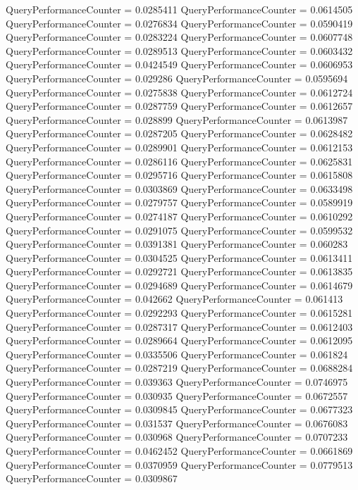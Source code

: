 \documentclass[9pt]{article}
\theoremstyle{plain}
\theoremstyle{definition}
\theoremstyle{remark}
\numberwithin{equation}{section}
\begin{document}
QueryPerformanceCounter  =  0.0285411
QueryPerformanceCounter  =  0.0614505
QueryPerformanceCounter  =  0.0276834
QueryPerformanceCounter  =  0.0590419
QueryPerformanceCounter  =  0.0283224
QueryPerformanceCounter  =  0.0607748
QueryPerformanceCounter  =  0.0289513
QueryPerformanceCounter  =  0.0603432
QueryPerformanceCounter  =  0.0424549
QueryPerformanceCounter  =  0.0606953
QueryPerformanceCounter  =  0.029286
QueryPerformanceCounter  =  0.0595694
QueryPerformanceCounter  =  0.0275838
QueryPerformanceCounter  =  0.0612724
QueryPerformanceCounter  =  0.0287759
QueryPerformanceCounter  =  0.0612657
QueryPerformanceCounter  =  0.028899
QueryPerformanceCounter  =  0.0613987
QueryPerformanceCounter  =  0.0287205
QueryPerformanceCounter  =  0.0628482
QueryPerformanceCounter  =  0.0289901
QueryPerformanceCounter  =  0.0612153
QueryPerformanceCounter  =  0.0286116
QueryPerformanceCounter  =  0.0625831
QueryPerformanceCounter  =  0.0295716
QueryPerformanceCounter  =  0.0615808
QueryPerformanceCounter  =  0.0303869
QueryPerformanceCounter  =  0.0633498
QueryPerformanceCounter  =  0.0279757
QueryPerformanceCounter  =  0.0589919
QueryPerformanceCounter  =  0.0274187
QueryPerformanceCounter  =  0.0610292
QueryPerformanceCounter  =  0.0291075
QueryPerformanceCounter  =  0.0599532
QueryPerformanceCounter  =  0.0391381
QueryPerformanceCounter  =  0.060283
QueryPerformanceCounter  =  0.0304525
QueryPerformanceCounter  =  0.0613411
QueryPerformanceCounter  =  0.0292721
QueryPerformanceCounter  =  0.0613835
QueryPerformanceCounter  =  0.0294689
QueryPerformanceCounter  =  0.0614679
QueryPerformanceCounter  =  0.042662
QueryPerformanceCounter  =  0.061413
QueryPerformanceCounter  =  0.0292293
QueryPerformanceCounter  =  0.0615281
QueryPerformanceCounter  =  0.0287317
QueryPerformanceCounter  =  0.0612403
QueryPerformanceCounter  =  0.0289664
QueryPerformanceCounter  =  0.0612095
QueryPerformanceCounter  =  0.0335506
QueryPerformanceCounter  =  0.061824
QueryPerformanceCounter  =  0.0287219
QueryPerformanceCounter  =  0.0688284
QueryPerformanceCounter  =  0.039363
QueryPerformanceCounter  =  0.0746975
QueryPerformanceCounter  =  0.030935
QueryPerformanceCounter  =  0.0672557
QueryPerformanceCounter  =  0.0309845
QueryPerformanceCounter  =  0.0677323
QueryPerformanceCounter  =  0.031537
QueryPerformanceCounter  =  0.0676083
QueryPerformanceCounter  =  0.030968
QueryPerformanceCounter  =  0.0707233
QueryPerformanceCounter  =  0.0462452
QueryPerformanceCounter  =  0.0661869
QueryPerformanceCounter  =  0.0370959
QueryPerformanceCounter  =  0.0779513
QueryPerformanceCounter  =  0.0309867
\end{document}

